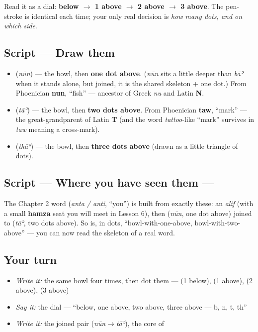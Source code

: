 Read it as a dial: \textbf{below $\to$ 1 above $\to$ 2 above $\to$ 3 above}. The pen-stroke is identical each time; your only real decision is \emph{how many dots, and on which side}.

\subsection*{Script — Draw them}
\begin{itemize}
\raggedright
  \item \textbf{} (\emph{nūn}) — the bowl, then \textbf{one dot above}. (\emph{nūn} sits a little deeper than \emph{bāʾ} when it stands alone, but joined, it is the shared skeleton + one dot.) From Phoenician \textbf{nun}, \textquotedblleft{}fish\textquotedblright{} — ancestor of Greek \emph{nu} and Latin \textbf{N}.
  \item \textbf{} (\emph{tāʾ}) — the bowl, then \textbf{two dots above}. From Phoenician \textbf{taw}, \textquotedblleft{}mark\textquotedblright{} — the great-grandparent of Latin \textbf{T} (and the word \emph{tattoo}-like \textquotedblleft{}mark\textquotedblright{} survives in \emph{taw} meaning a cross-mark).
  \item \textbf{} (\emph{thāʾ}) — the bowl, then \textbf{three dots above} (drawn as a little triangle of dots).
\end{itemize}

\subsection*{Script — Where you have seen them — }
The Chapter 2 word \textbf{} (\emph{anta / anti}, \textquotedblleft{}you\textquotedblright{}) is built from exactly these: an \emph{alif} (with a small \textbf{hamza} seat you will meet in Lesson 6), then \textbf{} (\emph{nūn}, one dot above) joined to \textbf{} (\emph{tāʾ}, two dots above). So \emph{} is, in dots, \textquotedblleft{}bowl-with-one-above, bowl-with-two-above\textquotedblright{} — you can now read the skeleton of a real word.

\subsection*{Your turn}
\begin{itemize}
\raggedright
  \item \emph{Write it:} the same bowl four times, then dot them —  (1 below),  (1 above),  (2 above),  (3 above)
  \item \emph{Say it:} the dial — \textquotedblleft{}below, one above, two above, three above — b, n, t, th\textquotedblright{}
  \item \emph{Write it:} the joined pair \textbf{} (\emph{nūn}$\to$\emph{tāʾ}), the core of \emph{}
\end{itemize}

